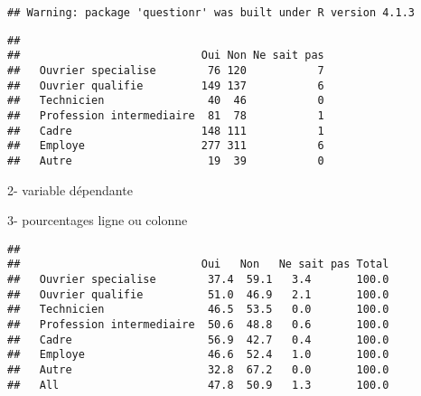 \documentclass[
]{article}
\newenvironment{Shaded}{\begin{snugshade}}{\end{snugshade}}
\newcommand{\CommentTok}[1]{\textcolor[rgb]{0.56,0.35,0.01}{\textit{#1}}}
\newcommand{\FunctionTok}[1]{\textcolor[rgb]{0.00,0.00,0.00}{#1}}
\newcommand{\NormalTok}[1]{#1}
\newcommand{\OtherTok}[1]{\textcolor[rgb]{0.56,0.35,0.01}{#1}}
\newcommand{\SpecialCharTok}[1]{\textcolor[rgb]{0.00,0.00,0.00}{#1}}
\newcommand{\StringTok}[1]{\textcolor[rgb]{0.31,0.60,0.02}{#1}}
\begin{document}
\begin{verbatim}
## Warning: package 'questionr' was built under R version 4.1.3
\end{verbatim}

\begin{Shaded}
\end{Shaded}

\begin{verbatim}
##                           
##                            Oui Non Ne sait pas
##   Ouvrier specialise        76 120           7
##   Ouvrier qualifie         149 137           6
##   Technicien                40  46           0
##   Profession intermediaire  81  78           1
##   Cadre                    148 111           1
##   Employe                  277 311           6
##   Autre                     19  39           0
\end{verbatim}

2- variable dépendante

3- pourcentages ligne ou colonne

\begin{Shaded}
\end{Shaded}

\begin{verbatim}
##                           
##                            Oui   Non   Ne sait pas Total
##   Ouvrier specialise        37.4  59.1   3.4       100.0
##   Ouvrier qualifie          51.0  46.9   2.1       100.0
##   Technicien                46.5  53.5   0.0       100.0
##   Profession intermediaire  50.6  48.8   0.6       100.0
##   Cadre                     56.9  42.7   0.4       100.0
##   Employe                   46.6  52.4   1.0       100.0
##   Autre                     32.8  67.2   0.0       100.0
##   All                       47.8  50.9   1.3       100.0
\end{verbatim}
\end{document}
